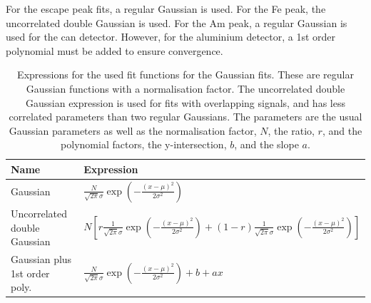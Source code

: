 For the escape peak fits, a regular Gaussian is used. For the Fe peak, the uncorrelated double Gaussian is used. For the Am peak, a regular Gaussian is used for the can detector. However, for the aluminium detector, a 1st order polynomial must be added to ensure convergence.

\begin{table}[htb]
  \centering
\begin{tabular}{ll}
\textbf{Name}                 & \textbf{Expression} \\ \hline
Gaussian                      & $\frac{N}{\sqrt{2\pi}\sigma}\exp{\left(-\frac{\left(x-\mu\right)^2}{2\sigma^2}\right)}$                    \\
Uncorrelated double Gaussian  & $N\left[r\frac{1}{\sqrt{2\pi}\sigma}\exp{\left(-\frac{\left(x-\mu\right)^2}{2\sigma^2}\right)}+(1-r)\frac{1}{\sqrt{2\pi}\sigma}\exp{\left(-\frac{\left(x-\mu\right)^2}{2\sigma^2}\right)}\right]$                     \\
Gaussian plus 1st order poly. & $\frac{N}{\sqrt{2\pi}\sigma}\exp{\left(-\frac{\left(x-\mu\right)^2}{2\sigma^2}\right)} + b + ax$                   
\end{tabular}
\caption{Expressions for the used fit functions for the Gaussian fits. These are regular Gaussian functions with a normalisation factor. The uncorrelated double Gaussian expression is used for fits with overlapping signals, and has less correlated parameters than two regular Gaussians. The parameters are the usual Gaussian parameters as well as the normalisation factor, $N$, the ratio, $r$, and the polynomial factors, the y-intersection, $b$, and the slope $a$.}
\label{tab:fitfuncchannelfits}
\end{table}

